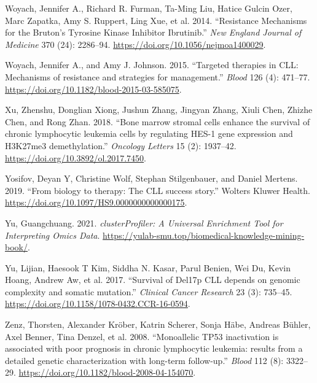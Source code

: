 \documentclass[11pt, a4paper, twosided]{book}
\newenvironment{CSLReferences}%
  {}%
  {\par}
\begin{document}
\begin{CSLReferences}{1}{0}
\leavevmode{}%
Woyach, Jennifer A., Richard R. Furman, Ta-Ming Liu, Hatice Gulcin Ozer, Marc Zapatka, Amy S. Ruppert, Ling Xue, et al. 2014. {``{Resistance Mechanisms for the Bruton's Tyrosine Kinase Inhibitor Ibrutinib}.''} \emph{New England Journal of Medicine} 370 (24): 2286--94. \url{https://doi.org/10.1056/nejmoa1400029}.

\leavevmode{}%
Woyach, Jennifer A., and Amy J. Johnson. 2015. {``{Targeted therapies in CLL: Mechanisms of resistance and strategies for management}.''} \emph{Blood} 126 (4): 471--77. \url{https://doi.org/10.1182/blood-2015-03-585075}.

\leavevmode{}%
Xu, Zhenshu, Donglian Xiong, Jushun Zhang, Jingyan Zhang, Xiuli Chen, Zhizhe Chen, and Rong Zhan. 2018. {``{Bone marrow stromal cells enhance the survival of chronic lymphocytic leukemia cells by regulating HES-1 gene expression and H3K27me3 demethylation}.''} \emph{Oncology Letters} 15 (2): 1937--42. \url{https://doi.org/10.3892/ol.2017.7450}.

\leavevmode{}%
Yosifov, Deyan Y, Christine Wolf, Stephan Stilgenbauer, and Daniel Mertens. 2019. {``{From biology to therapy: The CLL success story}.''} Wolters Kluwer Health. \url{https://doi.org/10.1097/HS9.0000000000000175}.

\leavevmode{}%
Yu, Guangchuang. 2021. \emph{clusterProfiler: A Universal Enrichment Tool for Interpreting Omics Data}. \url{https://yulab-smu.top/biomedical-knowledge-mining-book/}.

\leavevmode{}%
Yu, Lijian, Haesook T Kim, Siddha N. Kasar, Parul Benien, Wei Du, Kevin Hoang, Andrew Aw, et al. 2017. {``{Survival of Del17p CLL depends on genomic complexity and somatic mutation}.''} \emph{Clinical Cancer Research} 23 (3): 735--45. \url{https://doi.org/10.1158/1078-0432.CCR-16-0594}.

\leavevmode{}%
Zenz, Thorsten, Alexander Kröber, Katrin Scherer, Sonja Häbe, Andreas Bühler, Axel Benner, Tina Denzel, et al. 2008. {``{Monoallelic TP53 inactivation is associated with poor prognosis in chronic lymphocytic leukemia: results from a detailed genetic characterization with long-term follow-up.}''} \emph{Blood} 112 (8): 3322--29. \url{https://doi.org/10.1182/blood-2008-04-154070}.


\end{CSLReferences}
\end{document}
